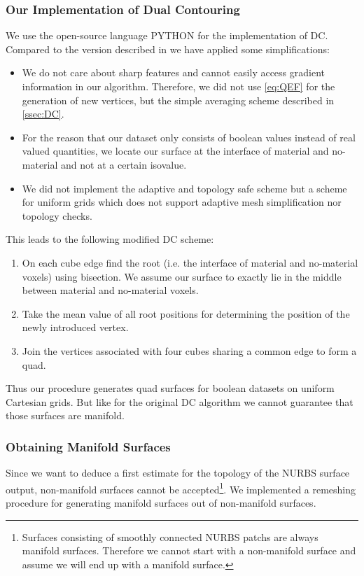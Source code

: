 \subsubsection{Our Implementation of Dual Contouring}
We use the open-source language PYTHON \cite{Python} for the implementation of \ac{DC}. Compared to the version described in \cite{Hermite2002} we have applied some simplifications:
\begin{itemize}
\item We do not care about sharp features and cannot easily access gradient information in our algorithm. Therefore, we did not use \autoref{eq:QEF} for the generation of new vertices, but the simple averaging scheme described in \autoref{ssec:DC}.
\item For the reason that our dataset only consists of boolean values instead of real valued quantities, we locate our surface at the interface of material and no-material and not at a certain isovalue.
\item We did not implement the adaptive and topology safe scheme but a scheme for uniform grids which does not support adaptive mesh simplification nor topology checks.
\end{itemize}
This leads to the following modified \ac{DC} scheme:
\begin{enumerate}
\item On each cube edge find the root (i.e. the interface of material and no-material voxels) using bisection. We assume our surface to exactly lie in the middle between material and no-material voxels.
\item Take the mean value of all root positions for determining the position of the newly introduced vertex.
\item Join the vertices associated with four cubes sharing a common edge to form a \ac{quad}.
\end{enumerate}
Thus our procedure generates \ac{quad} surfaces for boolean datasets on uniform Cartesian grids. But like for the original \ac{DC} algorithm we cannot guarantee that those surfaces are manifold.

\subsubsection{Obtaining Manifold Surfaces}
Since we want to deduce a first estimate for the topology of the \ac{NURBS} surface output, non-manifold surfaces cannot be accepted\footnote{Surfaces consisting of smoothly connected \ac{NURBS} \acp{patch} are always manifold surfaces. Therefore we cannot start with a non-manifold surface and assume we will end up with a manifold surface.}. We implemented a remeshing procedure for generating manifold surfaces out of non-manifold surfaces.

